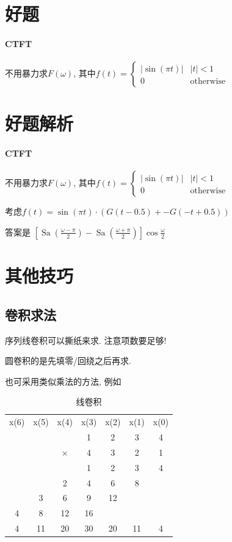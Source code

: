 \documentclass{ctexart}
\DeclareMathOperator{\Sa}{\mathrm{Sa}}
\newlength{\Oldarrayrulewidth}
\newcommand{\Hline}[1]{
  \noalign{\global\setlength{\Oldarrayrulewidth}{\arrayrulewidth}}
  \noalign{\global\setlength{\arrayrulewidth}{#1}}\hline
  \noalign{\global\setlength{\arrayrulewidth}{\Oldarrayrulewidth}}}
\newcommand{\Midline}{\Hline{0.05em}}
\begin{document}
\section{好题}
\paragraph{CTFT} 不用暴力求$F(\omega)$, 其中$f(t) = \begin{cases} |\sin(\pi t)| & |t| < 1\\ 0 & \text{otherwise} \end{cases}$


\pagebreak
\section{好题解析}
\paragraph{CTFT} 不用暴力求$F(\omega)$, 其中$f(t) = \begin{cases} |\sin(\pi t)| & |t| < 1\\ 0 & \text{otherwise} \end{cases}$\par
    考虑$f(t) = \sin(\pi t) \cdot \left( G(t-0.5) + -G(-t+0.5) \right)$\par
    答案是 $\left[\Sa\left(\frac{\omega - \pi}{2}\right) - \Sa\left(\frac{\omega + \pi}{2}\right)\right] \cos \frac{\omega}{2}$

\section{其他技巧}
\subsection{卷积求法}
    序列线卷积可以撕纸来求. 注意项数要足够!\par
    圆卷积的是先填零/回绕之后再求.\par
    也可采用类似乘法的方法, 例如

    \begin{table}[ht!]
        \centering
        \begin{tabular}{*{7}{c}}
        x(6) & x(5) & x(4)     & x(3) & x(2) & x(1) & x(0) \\
        \Midline
             &      &          & 1    & 2    & 3    & 4    \\
             &      & $\times$ & 4    & 3    & 2    & 1    \\
        \Midline
             &      &          & 1    & 2    & 3    & 4    \\
             &      & 2        & 4    & 6    & 8    &      \\
             & 3    & 6        & 9    & 12   &      &      \\
        4    & 8    & 12       & 16   &      &      &      \\
        \Midline
        4    & 11   & 20       & 30   & 20   & 11   & 4    \\
        \end{tabular}
        \caption{线卷积}
    \end{table}
\end{document}
